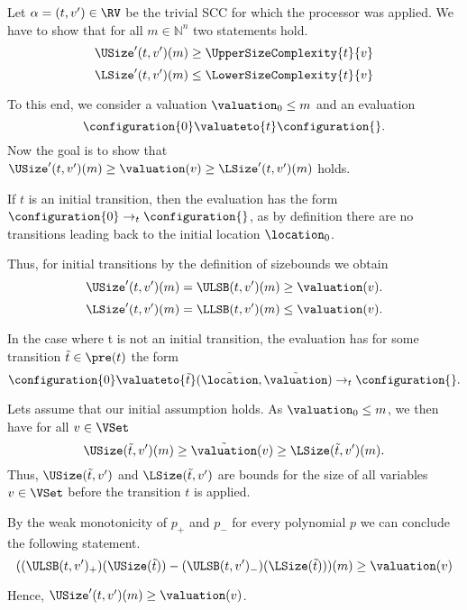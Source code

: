 Let $\alpha = (t, v') \in \RV$ be the trivial SCC for which the processor was applied.
We have to show that for all $m \in \mathbb{N}^n$ two statements hold.
\[ \USize'(t, v')(m) \geq \UpperSizeComplexity{t}{v} \]
\[ \LSize'(t, v')(m) \leq \LowerSizeComplexity{t}{v} \]

To this end, we consider a valuation $\valuation_0 \leq m$ and an evaluation
\[ \configuration{0} \valuateto{t} \configuration{} . \]
Now the goal is to show that $\USize'(t, v')(m) \geq \valuation(v) \geq \LSize'(t, v')(m)$ holds.

If $t$ is an initial transition, then the evaluation has the form $\configuration{0} \rightarrow_t \configuration{}$, as by definition there are no transitions leading back to the initial location $\location_0$.

Thus, for initial transitions by the definition of sizebounds we obtain
\[ \USize'(t, v')(m) = \ULSB(t, v')(m) \geq \valuation(v). \]
\[ \LSize'(t, v')(m) = \LLSB(t, v')(m) \leq \valuation(v). \]

In the case where t is not an initial transition, the evaluation has for some transition $\tilde{t} \in \pre(t)$ the form
\[ \configuration{0}  \valuateto{\tilde{t}} (\tilde{\location}, \tilde{\valuation}) \rightarrow_t \configuration{}. \]

Lets assume that our initial assumption holds.
As $\valuation_0 \leq m$, we then have for all $v \in \VSet$
\[ \USize(\tilde{t}, v')(m) \geq \tilde{\valuation}(v) \geq \LSize(\tilde{t}, v')(m). \]
Thus, $\USize(\tilde{t}, v')$ and $\LSize(\tilde{t}, v')$ are bounds for the size of all variables $v \in \VSet$ before the transition $t$ is applied.

By the weak monotonicity of $p_+$ and $p_-$ for every polynomial $p$ we can conclude the following statement.
\[ ((\ULSB(t, v')_+)(\USize(\tilde{t})) - (\ULSB(t, v')_-)(\LSize(\tilde{t})))(m) \geq \valuation(v) \]

Hence, $\USize'(t, v')(m) \geq \valuation(v)$.
